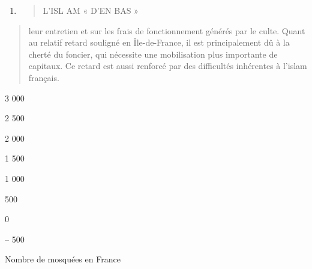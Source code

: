 \begin{enumerate}
\def\labelenumi{\Roman{enumi}.}
\setcounter{enumi}{2}
\item
  \begin{quote}
  L'ISL AM « D'EN BAS »
  \end{quote}
\end{enumerate}

\begin{quote}
leur entretien et sur les frais de fonctionnement générés par le culte.
Quant au relatif retard souligné en Île-de-France, il est principalement
dû à la cherté du foncier, qui nécessite une mobilisation plus
importante de capitaux. Ce retard est aussi renforcé par des difficultés
inhérentes à l'islam français.
\end{quote}

3 000

2 500

2 000

1 500

1 000

500

0

-- 500

\hfill\break
Nombre de mosquées en France

